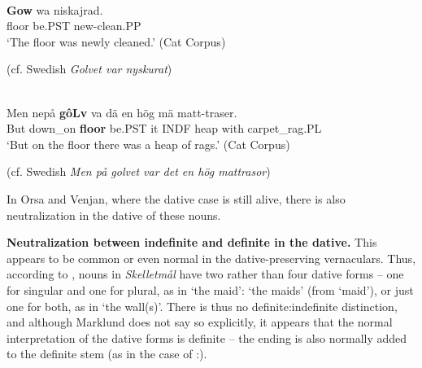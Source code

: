 
\ea\label{}
\\
\gll	\textbf{Gow} wa  niskajrad.\\
		floor  be.PST  new-clean.PP\\
\glt 	‘The floor was newly cleaned.’ (Cat Corpus)

\z

(cf. Swedish \textit{Golvet var nyskurat}) 



\ea\label{}
\\
\gll	Men  nepå  \textbf{gôLv} va  dä  en  hög  mä  matt-traser.\\
		But  down\_on  \textbf{floor} be.PST  it  INDF  heap  with  carpet\_rag.PL\\
\glt	‘But on the floor there was a heap of rags.’ (Cat Corpus)

\z

(cf. Swedish \textit{Men på golvet var det en hög mattrasor})


In Orsa and Venjan, where the dative case is still alive, there is also neutralization in the dative of these nouns. 


\textbf{Neutralization between indefinite and definite in the dative.} This appears to be common or even normal in the dative-preserving vernaculars. Thus, according to \citet{Marklund1976}, nouns in \textit{Skelletmål} have two rather than four dative forms – one for singular and one for plural, as in  ‘the maid’:  ‘the maids’ (from  ‘maid’), or just one for both, as in ‘the wall(s)’. There is thus no definite:indefinite distinction, and although Marklund does not say so explicitly, it appears that the normal interpretation of the dative forms is definite – the ending is also normally added to the definite stem (as in the case of :).

